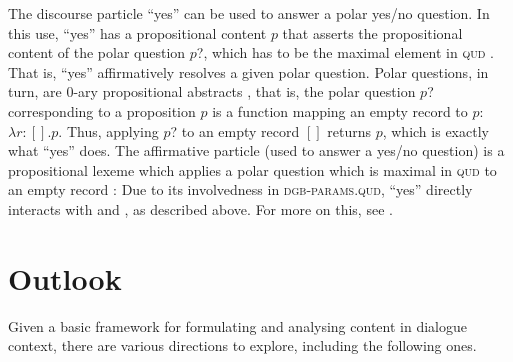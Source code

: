 \documentclass[output=paper
 	        ,biblatex
                ,babelshorthands
                ,newtxmath
                ,draftmode
                ,colorlinks, citecolor=brown
]{langscibook}
\begin{document}
The discourse particle \enquote{yes} can be used to answer a polar yes/no question.
%
In this use, \enquote{yes} has a propositional content $p$ that asserts the propositional content of the polar question $p$?, which has to be the maximal element in \textsc{qud} \citep[Chapter~2,  \textit{et seq.}]{Ginzburg:2012}.
%
That is, \enquote{yes} affirmatively resolves a given polar question.
%
Polar questions, in turn, are 0-ary propositional abstracts \citep[]{Ginzburg:2012}, that is, the polar question $p$? corresponding to a proposition $p$ is a function mapping an empty record to $p$: $\lambda r : [] . p$.
%
Thus, applying $p$? to an empty record $[]$ returns $p$, which is exactly what \enquote{yes} does.
%
The affirmative particle (used to answer a yes/no question) is a propositional lexeme which applies a polar question which is maximal in \textsc{qud} to an empty record \citep[cf.][]{Ginzburg:2012}:
%
\ea
{}
\z 
%
Due to its involvedness in \textsc{dgb-params.qud}, \enquote{yes} directly interacts with  and , as described above.
%
For more on this, see \citet{Ginzburg:2012}.



\section{Outlook}
\label{sec:outlook-dialogue}

Given a basic framework for formulating and analysing content in dialogue context, there are various directions to explore, including the following ones.
\end{document}
